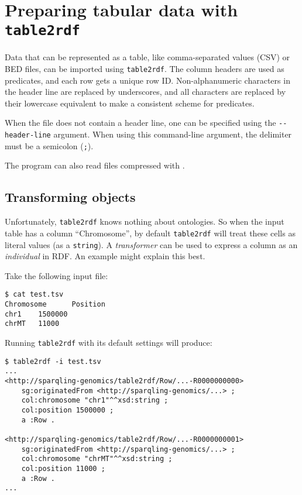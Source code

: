 \section{Preparing tabular data with \texttt{table2rdf}}
\label{sec:table2rdf}

  Data that can be represented as a table, like comma-separated values (CSV)
  or BED files, can be imported using \texttt{table2rdf}.  The column headers
  are used as predicates, and each row gets a unique row ID.  Non-alphanumeric
  characters in the header line are replaced by underscores, and all characters
  are replaced by their lowercase equivalent to make a consistent scheme for
  predicates.

  When the file does not contain a header line, one can be specified using the
  \texttt{-{}-header-line} argument.  When using this command-line argument, the
  delimiter must be a semicolon (\texttt{;}).

  The program can also read files compressed with .

\subsection{Transforming objects}

  Unfortunately, \texttt{table2rdf} knows nothing about ontologies.  So when
  the input table has a column ``Chromosome'', by default \texttt{table2rdf}
  will treat these cells as literal values (as a \texttt{string}).  A
  \emph{transformer} can be used to express a column as an \emph{individual} in
  RDF.  An example might explain this best.

  Take the following input file:
\begin{siderules}
\begin{verbatim}
$ cat test.tsv
Chromosome      Position
chr1    1500000
chrMT   11000
\end{verbatim}
\end{siderules}

  Running \texttt{table2rdf} with its default settings will produce:

\begin{siderules}
\begin{verbatim}
$ table2rdf -i test.tsv
...
<http://sparqling-genomics/table2rdf/Row/...-R0000000000>
    sg:originatedFrom <http://sparqling-genomics/...> ;
    col:chromosome "chr1"^^xsd:string ;
    col:position 1500000 ;
    a :Row .

<http://sparqling-genomics/table2rdf/Row/...-R0000000001>
    sg:originatedFrom <http://sparqling-genomics/...> ;
    col:chromosome "chrMT"^^xsd:string ;
    col:position 11000 ;
    a :Row .
...
\end{verbatim}
\end{siderules}

